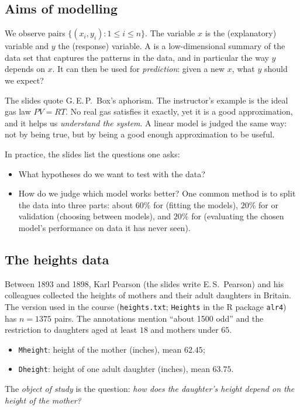 \subsection{Aims of modelling}
\begin{definition}\label{def:L04-vars}
We observe pairs $\{(x_i,y_i):1\le i\le n\}$. The variable $x$ is the
 (explanatory) variable and $y$ the  (response)
variable. A  is a low-dimensional summary of the data set that captures the
patterns in the data, and in particular the way $y$ depends on $x$. It can then be used for
\emph{prediction}: given a new $x$, what $y$ should we expect?
\end{definition}

\begin{note}
The slides quote G.\,E.\,P.~Box's aphorism. The instructor's example is the ideal gas law
$PV=RT$. No real gas satisfies it exactly, yet it is a good approximation, and it helps us
\emph{understand the system}. A linear model is judged the same way: not by being true, but by
being a good enough approximation to be useful.
\end{note}

In practice, the slides list the questions one asks:
\begin{itemize}
  \item What hypotheses do we want to test with the data?
  \item How do we judge which model works better? One common method is to split the data into three parts: about $60\%$ for  (fitting the models), $20\%$ for  or validation (choosing between models), and $20\%$ for  (evaluating the chosen model's performance on data it has never seen).
\end{itemize}

\subsection{The heights data}
\begin{example}\label{ex:L04-heights}
Between 1893 and 1898, Karl Pearson (the slides write E.\,S.~Pearson) and his colleagues collected
the heights of mothers and their adult daughters in Britain. The version used in the course
(\texttt{heights.txt}; \texttt{Heights} in the R package \texttt{alr4}) has $n=1375$ pairs. The
annotations mention ``about 1500 odd'' and the restriction to daughters aged at least $18$
and mothers under $65$.
\begin{itemize}
  \item \texttt{Mheight}: height of the mother (inches), mean $62.45$;
  \item \texttt{Dheight}: height of one adult daughter (inches), mean $63.75$.
\end{itemize}
The \emph{object of study} is the question: \emph{how does the daughter's height depend on the
height of the mother?}
\end{example}

